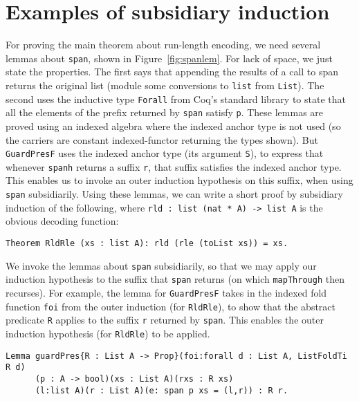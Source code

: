 \documentclass[a4paper,USenglish]{lipics-v2021}
\begin{document}
\section{Examples of subsidiary induction}
\label{sec:examplesi}

For proving the main theorem about run-length encoding, we need
several lemmas about \verb|span|, shown in Figure~\ref{fig:spanlem}.
For lack of space, we just state the properties.  The first says that
appending the results of a call to span returns the original list
(module some conversions to \verb|list| from \verb|List|).  The second
uses the inductive type \verb|Forall| from Coq's standard library to
state that all the elements of the prefix returned by \verb|span|
satisfy \verb|p|.  These lemmas are proved using an indexed algebra
where the indexed anchor type is not used (so the carriers are
constant indexed-functor returning the types shown).  But
\verb|GuardPresF| uses the indexed anchor type (its argument \verb|S|),
to express that whenever \verb|spanh| returns a suffix \verb|r|, that
suffix satisfies the indexed anchor type.  This enables us to invoke
an outer induction hypothesis on this suffix, when using \verb|span|
subsidiarily.  Using these lemmas, we can write a short proof by
subsidiary induction of the following, where
\verb|rld : list (nat * A) -> list A| is the obvious decoding
function:

\begin{verbatim}
Theorem RldRle (xs : list A): rld (rle (toList xs)) = xs.  
\end{verbatim}

\noindent We invoke the lemmas about \verb|span| subsidiarily,
so that we may apply our induction hypothesis to the suffix
that \verb|span| returns (on which \verb|mapThrough| then recurses).
For example, the lemma for \verb|GuardPresF| takes in the
indexed fold function \verb|foi| from the outer induction (for \verb|RldRle|),
to show that the abstract predicate \verb|R| applies to the suffix
\verb|r| returned by \verb|span|.  This enables the outer induction
hypothesis (for \verb|RldRle|) to be applied.

\begin{verbatim}
Lemma guardPres{R : List A -> Prop}(foi:forall d : List A, ListFoldTi R d)
      (p : A -> bool)(xs : List A)(rxs : R xs)
      (l:list A)(r : List A)(e: span p xs = (l,r)) : R r.
\end{verbatim} 
\end{document}
